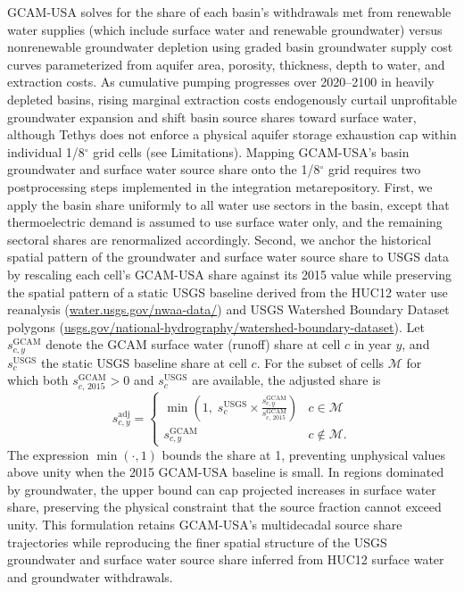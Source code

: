 \documentclass[fleqn,10pt]{wlscirep}
\begin{document}
GCAM-USA solves for the share of each basin's withdrawals met from renewable water supplies (which include surface water and renewable groundwater) versus nonrenewable groundwater depletion using graded basin groundwater supply cost curves parameterized from aquifer area, porosity, thickness, depth to water, and extraction costs\cite{Binsted_2022,Niazi2024PeakWater,superwell}. As cumulative pumping progresses over 2020--2100 in heavily depleted basins, rising marginal extraction costs endogenously curtail unprofitable groundwater expansion and shift basin source shares toward surface water, although Tethys does not enforce a physical aquifer storage exhaustion cap within individual 1/8$^{\circ}$ grid cells (see Limitations). Mapping GCAM-USA's basin groundwater and surface water source share onto the 1/8$^{\circ}$ grid requires two postprocessing steps implemented in the integration metarepository\cite{cambrackenIMMMSFATethys_integration_metarepoV1012026}. First, we apply the basin share uniformly to all water use sectors in the basin, except that thermoelectric demand is assumed to use surface water only, and the remaining sectoral shares are renormalized accordingly. Second, we anchor the historical spatial pattern of the groundwater and surface water source share to USGS data by rescaling each cell's GCAM-USA share against its 2015 value while preserving the spatial pattern of a static USGS baseline derived from the HUC12 water use reanalysis\cite{Stets2025USGS,Haynes2023USGS,Luukkonen2023USGS} (\href{https://water.usgs.gov/nwaa-data/}{water.usgs.gov/nwaa-data/}) and USGS Watershed Boundary Dataset polygons (\href{https://www.usgs.gov/national-hydrography/watershed-boundary-dataset}{usgs.gov/national-hydrography/watershed-boundary-dataset}). Let $s^{\mathrm{GCAM}}_{c,y}$ denote the GCAM surface water (runoff) share at cell $c$ in year $y$, and $s^{\mathrm{USGS}}_c$ the static USGS baseline share at cell $c$. For the subset of cells $\mathcal{M}$ for which both $s^{\mathrm{GCAM}}_{c,\,2015}>0$ and $s^{\mathrm{USGS}}_c$ are available, the adjusted share is
\begin{equation}
s^{\mathrm{adj}}_{c,y} =
\begin{cases}
\displaystyle \min\!\left(1,\; s^{\mathrm{USGS}}_c \times \frac{s^{\mathrm{GCAM}}_{c,y}}{s^{\mathrm{GCAM}}_{c,\,2015}}\right) & c \in \mathcal{M} \\[10pt]
s^{\mathrm{GCAM}}_{c,y}                                                                                        & c \notin \mathcal{M}.
\end{cases}
\label{eq:source-shares}
\end{equation}
The expression $\min(\cdot,1)$ bounds the share at 1, preventing unphysical values above unity when the 2015 GCAM-USA baseline is small. In regions dominated by groundwater, the upper bound can cap projected increases in surface water share, preserving the physical constraint that the source fraction cannot exceed unity. This formulation retains GCAM-USA's multidecadal source share trajectories while reproducing the finer spatial structure of the USGS groundwater and surface water source share inferred from HUC12 surface water and groundwater withdrawals\cite{Stets2025USGS}.
\end{document}

